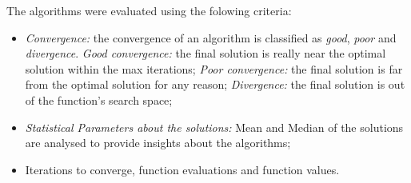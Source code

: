 \documentclass[conference]{IEEEtran}
\begin{document}
The algorithms were evaluated using the folowing criteria:

\begin{itemize}
	\item \textit{Convergence: } the convergence of an algorithm is classified as \textit{good}, \textit{poor} and \textit{divergence}.
	\subitem \textit{Good convergence: } the final solution is really near the optimal solution within the max iterations;
	\subitem \textit{Poor convergence: } the final solution is far from the optimal solution for any reason;
	\subitem \textit{Divergence: }  the final solution is out of the function's search space;
	\item \textit{Statistical Parameters about the solutions:} Mean and Median of the solutions are analysed to provide insights about the algorithms;
	\item Iterations to converge, function evaluations and function values.
\end{itemize}
\end{document}
